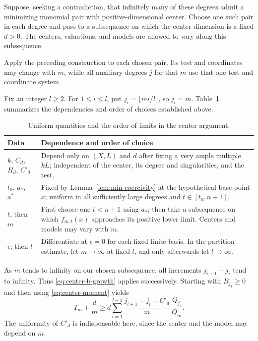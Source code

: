 Suppose, seeking a contradiction, that infinitely many of these degrees
admit a minimizing monomial pair with positive-dimensional center.
Choose one such pair in each degree and pass to a subsequence on which
the center dimension is a fixed $d>0$. The centers, valuations, and
models are allowed to vary along this subsequence.

Apply the preceding construction to each chosen pair. Its test and
coordinates may change with $m$, while all auxiliary degrees $j$ for
that $m$ use that one test and coordinate system.

Fix an integer $l\ge2$. For $1\le i\le l$, put
$j_i=\lfloor mi/l\rfloor$, so $j_l=m$. Table~\ref{tab:constants}
summarizes the dependencies and order of choices established above.

\begin{table}[tbp]
\centering
\small
\begin{tabular}{@{}p{}p{}@{}}
\toprule
Data & Dependence and order of choice \\
\midrule
$k$, $C_d$, $H_d$, $C'_d$ & Depend only on $(X,L)$ and $d$ after
  fixing a very ample multiple $kL$; independent of the center,
  its degree and singularities, and the test. \\[3pt]
$t_0$, $a_*$, $a^*$ & Fixed by Lemma~\ref{lem:min-coercivity} at the
  hypothetical base point $x$; uniform in all sufficiently large degrees
  and $t\in[t_0,n+1]$. \\[3pt]
$t$, then $m$ & First choose one $t<n+1$ using $a_*$; then take a
  subsequence on which $f_{m,t}(x)$ approaches its positive lower limit.
  Centers and models may vary with $m$. \\[3pt]
$\epsilon$; then $l$ & Differentiate at $\epsilon=0$ for each fixed
  finite basis. In the partition estimate, let $m\to\infty$ at fixed
  $l$, and only afterwards let $l\to\infty$. \\
\bottomrule
\end{tabular}
\caption{Uniform quantities and the order of limits in the center argument.}
\label{tab:constants}
\end{table}

As $m$ tends to infinity on
our chosen subsequence, all increments $j_{i+1}-j_i$ tend to infinity.
Thus \eqref{eq:center-b-growth} applies successively. Starting with
$B_{j_1}\ge0$ and then using \eqref{eq:center-moment} yields
\begin{equation}\label{eq:center-partition-bound}
 T_m+\frac dm
 \ge d\sum_{i=1}^{l-1}
       \frac{j_{i+1}-j_i-C'_d}{m}\,
       \frac{Q_{j_i}}{Q_m}.
\end{equation}
The uniformity of $C'_d$ is indispensable here, since the center and
the model may depend on $m$.

